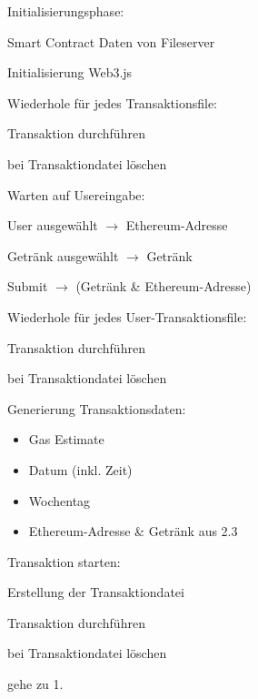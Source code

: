 \begin{legal}
	\item Initialisierungsphase:
	\begin{legal}
		\item {} Smart Contract Daten von Fileserver
		\item Initialisierung Web3.js
		\item Wiederhole für jedes Transaktionsfile:
		\begin{legal}
			\item Transaktion durchführen
			\item bei  Transaktiondatei löschen
		\end{legal}
	\end{legal}
	\item Warten auf Usereingabe:
	\begin{legal}
		\item User ausgewählt $\rightarrow$ Ethereum-Adresse
		\item Getränk ausgewählt $\rightarrow$ Getränk
		\item Submit $\rightarrow$ (Getränk \& Ethereum-Adresse)
	\end{legal}
	\item Wiederhole für jedes User-Transaktionsfile:
	\begin{legal}
		\item Transaktion durchführen
		\item bei  Transaktiondatei löschen
	\end{legal}
	\item Generierung Transaktionsdaten:
	\begin{itemize}
		\item Gas Estimate
		\item Datum (inkl. Zeit)
		\item Wochentag
		\item Ethereum-Adresse \& Getränk aus 2.3
	\end{itemize}
	\item Transaktion starten:
	\begin{legal}
		\item Erstellung der Transaktiondatei
		\item Transaktion durchführen
		\item bei  Transaktiondatei löschen
		\item gehe zu 1.
	\end{legal} 	
\end{legal}

